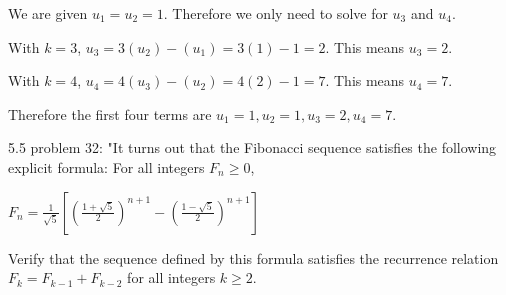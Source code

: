 \documentclass{article}
\begin{document}
\item We are given $u_1 = u_2 = 1.$ Therefore we only need to solve for $u_3$ and $u_4$.
\item With $k = 3$, $u_3 = 3(u_2) - (u_1) = 3(1) - 1 = 2$. This means $u_3 = 2$.
\item With $k = 4$, $u_4 = 4(u_3) - (u_2) = 4(2) - 1 = 7$. This means $u_4 = 7$.
\item Therefore the first four terms are $u_1 = 1, u_2 = 1, u_3 = 2, u_4 = 7$.




\clearpage
\header

\item 5.5 problem 32: "It turns out that the Fibonacci sequence satisfies the following explicit formula: For all integers $F_n \geq 0$,

\item $F_n = \frac{1}{\sqrt{5}}[(\frac{1 + \sqrt{5}}{2})^{n+1} - (\frac{1 - \sqrt{5}}{2})^{n+1}]$

\item Verify that the sequence defined by this formula satisfies the recurrence relation $F_k = F_{k-1}+F_{k-2}$ for all integers $k\geq2$.
\end{document}
